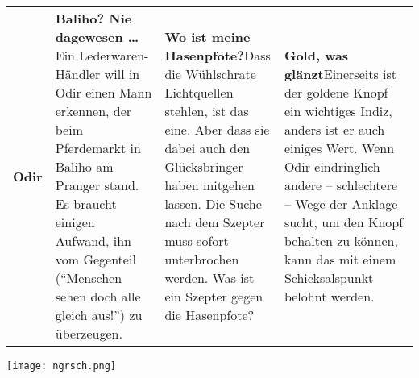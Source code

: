 \documentclass[openright]{Ilaris}
\begin{document}
\begin{tabularx}{0.98\linewidth}{l|XXX}
	\textbf{Odir}&\textbf{Baliho? Nie dagewesen \dots}\newline Ein Lederwaren-Händler will in Odir einen Mann erkennen, der beim Pferdemarkt in Baliho am Pranger stand. Es braucht einigen Aufwand, ihn vom Gegenteil (\enquote{Menschen sehen doch alle gleich aus!}) zu überzeugen.&\textbf{Wo ist meine Hasenpfote?}\newline Dass die Wühlschrate Lichtquellen stehlen, ist das eine. Aber dass sie dabei auch den Glücksbringer haben mitgehen lassen. Die Suche nach dem Szepter muss sofort unterbrochen werden. Was ist ein Szepter gegen die Hasenpfote?&\textbf{Gold, was glänzt}\newline Einerseits ist der goldene Knopf ein wichtiges Indiz, anders ist er auch einiges Wert. Wenn Odir eindringlich andere -- schlechtere -- Wege der Anklage sucht, um den Knopf behalten zu können, kann das mit einem Schicksalspunkt belohnt werden.\\

\end{tabularx}


\neueseite

\handout

\label{karten}
\begin{center}
	\texttt{[image: ngrsch.png]}
\end{center}

\vfill
\end{document}
